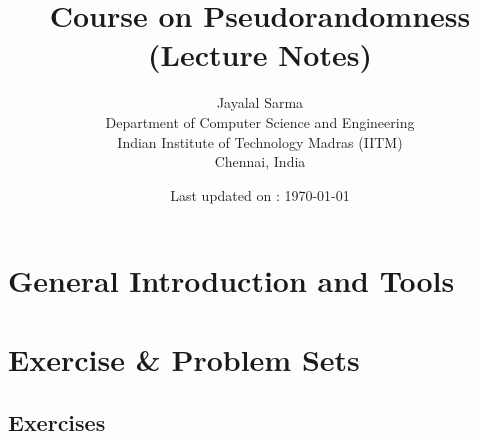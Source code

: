\documentclass[11pt]{report}
\title{{\huge \sf Course on Pseudorandomness} \\[3mm]
{\sf \LARGE(Lecture Notes)}\\[1cm]}
\author{{\Large {\sc Jayalal Sarma}} \\[3mm]
Department of Computer Science and Engineering \\[1mm]
Indian Institute of Technology Madras (IITM)\\[1mm]
Chennai, India}
\date{Last updated on : \today}
\begin{document}
\maketitle
\setcounter{page}{1}
\newpage
{}
\tableofcontents
\listoftodos
\setcounter{page}{1}
\part{General Introduction and Tools}






%
%
%
%
%
%
%
%
%
%
%
%
%
%
%
%
%
%
%
%
%
%
%
%
%
%
%
%
%
%

%

\part{Exercise \& Problem Sets}
\chapter{Exercises}
\end{document}
